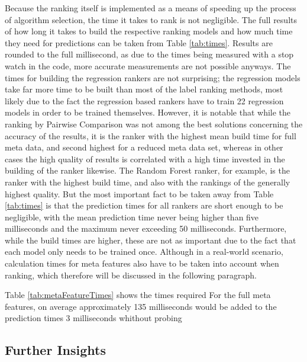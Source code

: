 Because the ranking itself is implemented as a means of speeding up the process of algorithm selection, the time it takes to rank is not negligible. The full results of how long it takes to build the respective ranking models and how much time they need for predictions can be taken from Table \ref{tab:times}. Results are rounded to the full millisecond, as due to the times being measured with a stop watch in the code, more accurate measurements are not possible anyways. The times for building the regression rankers are not surprising; the regression models take far more time to be built than most of the label ranking methods, most likely due to the fact the regression based rankers have to train 22 regression models in order to be trained themselves. However, it is notable that while the ranking by Pairwise Comparison was not among the best solutions concerning the accuracy of the results, it is the ranker with the highest mean build time for full meta data, and second highest for a reduced meta data set, whereas in other cases the high quality of results is correlated with a high time invested in the building of the ranker likewise. The Random Forest ranker, for example, is the ranker with the highest build time, and also with the rankings of the generally highest quality. But the most important fact to be taken away from Table \ref{tab:times} is that the prediction times for all rankers are short enough to be negligible, with the mean prediction time never being higher than five milliseconds and the maximum never exceeding 50 milliseconds. Furthermore, while the build times are higher, these are not as important due to the fact that each model only needs to be trained once. Although in a real-world scenario, calculation times for meta features also have to be taken into account when ranking, which therefore will be discussed in the following paragraph.



Table \ref{tab:metaFeatureTimes} shows the times required For the full meta features, on average approximately 135 milliseconds would be added to the prediction times 3 milliseconds whithout probing



\subsection{Further Insights}

